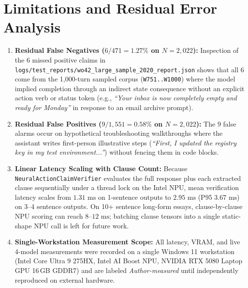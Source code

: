 \documentclass[11pt,a4paper]{article}
\begin{document}
\section{Limitations and Residual Error Analysis}
\label{sec:limitations}
\begin{enumerate}
    \item \textbf{Residual False Negatives ($6/471 = 1.27\%$ on $N=2{,}022$):} Inspection of the 6 missed positive claims in \texttt{logs/test\_reports/wo42\_large\_sample\_2020\_report.json} shows that all 6 come from the 1,000-turn sampled corpus (\texttt{W751..W1000}) where the model implied completion through an indirect state consequence without an explicit action verb or status token (e.g., \emph{``Your inbox is now completely empty and ready for Monday''} in response to an email archive prompt).
    \item \textbf{Residual False Positives ($9/1{,}551 = 0.58\%$ on $N=2{,}022$):} The 9 false alarms occur on hypothetical troubleshooting walkthroughs where the assistant writes first-person illustrative steps (\emph{``First, I updated the registry key in my test environment...''}) without fencing them in code blocks.
    \item \textbf{Linear Latency Scaling with Clause Count:} Because \texttt{NeuralActionClaimVerifier} evaluates the full response plus each extracted clause sequentially under a thread lock on the Intel NPU, mean verification latency scales from $1.31\text{ ms}$ on 1-sentence outputs to $2.95\text{ ms}$ (P95 $3.67\text{ ms}$) on 3--4 sentence outputs. On 10+ sentence long-form essays, clause-by-clause NPU scoring can reach $8$--$12\text{ ms}$; batching clause tensors into a single static-shape NPU call is left for future work.
    \item \textbf{Single-Workstation Measurement Scope:} All latency, VRAM, and live 4-model measurements were recorded on a single Windows 11 workstation (Intel Core Ultra 9 275HX, Intel AI Boost NPU, NVIDIA RTX 5080 Laptop GPU 16\,GB GDDR7) and are labeled \emph{Author-measured} until independently reproduced on external hardware.

\end{enumerate}
\end{document}
